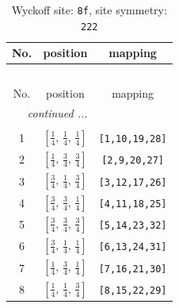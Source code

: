 \documentclass[fleqn,8pt]{jsarticle}
\begin{document}
\begin{longtable}{ccc}
\caption{Wyckoff site: {\tt 8f}, site symmetry: {\tt 222}}
 \\
 \hline \hline
No. & position & mapping \\ \hline \endfirsthead

\multicolumn{2}{l}{\tablename\ \thetable{}} \\
 \hline \hline
No. & position & mapping \\ \hline \endhead

 \hline \hline
\multicolumn{2}{r}{\footnotesize\it continued ...} \\ \endfoot

 \hline \hline
\multicolumn{2}{r}{} \\ \endlastfoot

1 & $\left[ \frac{1}{4},\, \frac{1}{4},\, \frac{1}{4} \right]$ & {\tt [1,10,19,28]} \\ \hline
2 & $\left[ \frac{1}{4},\, \frac{3}{4},\, \frac{3}{4} \right]$ & {\tt [2,9,20,27]} \\ \hline
3 & $\left[ \frac{3}{4},\, \frac{1}{4},\, \frac{3}{4} \right]$ & {\tt [3,12,17,26]} \\ \hline
4 & $\left[ \frac{3}{4},\, \frac{3}{4},\, \frac{1}{4} \right]$ & {\tt [4,11,18,25]} \\ \hline
5 & $\left[ \frac{3}{4},\, \frac{3}{4},\, \frac{3}{4} \right]$ & {\tt [5,14,23,32]} \\ \hline
6 & $\left[ \frac{3}{4},\, \frac{1}{4},\, \frac{1}{4} \right]$ & {\tt [6,13,24,31]} \\ \hline
7 & $\left[ \frac{1}{4},\, \frac{3}{4},\, \frac{1}{4} \right]$ & {\tt [7,16,21,30]} \\ \hline
8 & $\left[ \frac{1}{4},\, \frac{1}{4},\, \frac{3}{4} \right]$ & {\tt [8,15,22,29]} \\
\end{longtable}
\renewcommand{\arraystretch}{1.2}
\end{document}

